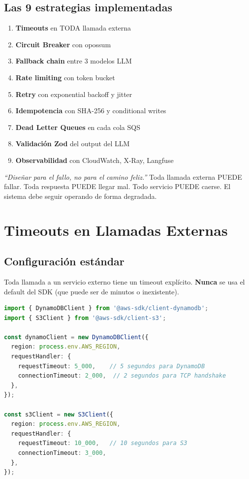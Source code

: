 \documentclass[11pt,a4paper]{article}
\begin{document}
\subsection{Las 9 estrategias implementadas}

\begin{enumerate}[leftmargin=*]
    \item \textbf{Timeouts} en TODA llamada externa
    \item \textbf{Circuit Breaker} con opossum
    \item \textbf{Fallback chain} entre 3 modelos LLM
    \item \textbf{Rate limiting} con token bucket
    \item \textbf{Retry} con exponential backoff y jitter
    \item \textbf{Idempotencia} con SHA-256 y conditional writes
    \item \textbf{Dead Letter Queues} en cada cola SQS
    \item \textbf{Validaci\'on Zod} del output del LLM
    \item \textbf{Observabilidad} con CloudWatch, X-Ray, Langfuse
\end{enumerate}

\begin{tcolorbox}[colback=red!5!white, colframe=critical, title=\textbf{Principio fundamental}]
\textit{``Dise\~nar para el fallo, no para el camino feliz.''} Toda llamada externa PUEDE fallar. Toda respuesta PUEDE llegar mal. Todo servicio PUEDE caerse. El sistema debe seguir operando de forma degradada.
\end{tcolorbox}

\section{Timeouts en Llamadas Externas}

\subsection{Configuraci\'on est\'andar}

Toda llamada a un servicio externo tiene un timeout expl\'icito. \textbf{Nunca} se usa el default del SDK (que puede ser de minutos o inexistente).

\begin{lstlisting}[language=TypeScript, caption={Timeout en AWS SDK v3}, label={lst:aws-timeout}]
import { DynamoDBClient } from '@aws-sdk/client-dynamodb';
import { S3Client } from '@aws-sdk/client-s3';

const dynamoClient = new DynamoDBClient({
  region: process.env.AWS_REGION,
  requestHandler: {
    requestTimeout: 5_000,    // 5 segundos para DynamoDB
    connectionTimeout: 2_000,  // 2 segundos para TCP handshake
  },
});

const s3Client = new S3Client({
  region: process.env.AWS_REGION,
  requestHandler: {
    requestTimeout: 10_000,   // 10 segundos para S3
    connectionTimeout: 3_000,
  },
});
\end{lstlisting}
\end{document}
